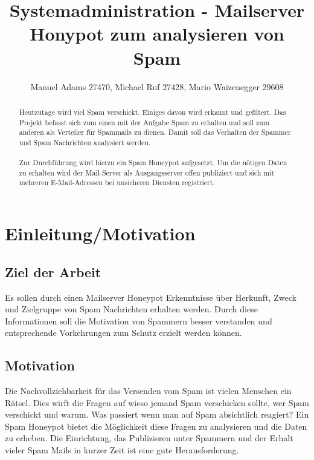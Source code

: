 \documentclass[a4paper,11pt,singlespacing]{article}
\begin{document}

\title{Systemadministration - Mailserver Honypot zum analysieren von Spam}
\author{Manuel Adams 27470, Michael Ruf 27428, Mario Waizenegger 29608}
\maketitle
\begin{abstract}
Heutzutage wird viel Spam verschickt. Einiges davon wird erkannt und gefiltert.
Das Projekt befasst sich zum einen mit der Aufgabe Spam zu erhalten und soll zum anderen als Verteiler für Spammails zu dienen.
Damit soll das Verhalten der Spammer und Spam Nachrichten analysiert werden.
\\\\
Zur Durchführung wird hierzu ein Spam Honeypot aufgesetzt.
Um die nötigen Daten zu erhalten wird der Mail-Server als Ausgangsserver offen publiziert und sich mit mehreren E-Mail-Adressen bei unsicheren Diensten registriert.
\end{abstract}

\newpage

\tableofcontents

\newpage
{}

\section{Einleitung/Motivation}\label{sec:Einleitung}

	\subsection{Ziel der Arbeit}\label{sec:EinleitungZiel}
		Es sollen durch einen Mailserver Honeypot Erkenntnisse über Herkunft, Zweck und Zielgruppe von Spam Nachrichten erhalten werden.
		Durch diese Informationen soll die Motivation von Spammern besser verstanden und entsprechende Vorkehrungen zum Schutz erzielt werden können.

	\subsection{Motivation}\label{sec:EinleitungMotivation}
		Die Nachvollziehbarkeit für das Versenden vom Spam ist vielen Menschen ein Rätsel.
		Dies wirft die Fragen auf wieso jemand Spam verschicken sollte, wer Spam verschickt und warum.
		Was passiert wenn man auf Spam absichtlich reagiert?
		Ein Spam Honeypot bietet die Möglichkeit diese Fragen zu analysieren und die Daten zu erheben.
		Die Einrichtung, das Publizieren unter Spammern und der Erhalt vieler Spam Mails in kurzer Zeit ist eine gute Herausforderung.
	
\end{document}
